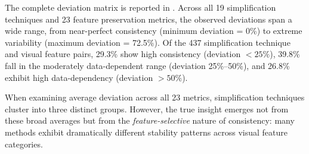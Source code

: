 The complete deviation matrix is reported in . Across all 19 simplification techniques and 23 feature preservation metrics, the observed deviations span a wide range, from near-perfect consistency (minimum deviation = 0\%) to extreme variability (maximum deviation = 72.5\%). Of the 437 simplification technique and visual feature pairs, 29.3\% show high consistency (deviation $< 25\%$), 39.8\% fall in the moderately data-dependent range (deviation 25\%--50\%), and 26.8\% exhibit high data-dependency (deviation $> 50\%$).

When examining average deviation across all 23 metrics, simplification techniques cluster into three distinct groups. However, the true insight emerges not from these broad averages but from the \emph{feature-selective} nature of consistency: many methods exhibit dramatically different stability patterns across visual feature categories.


